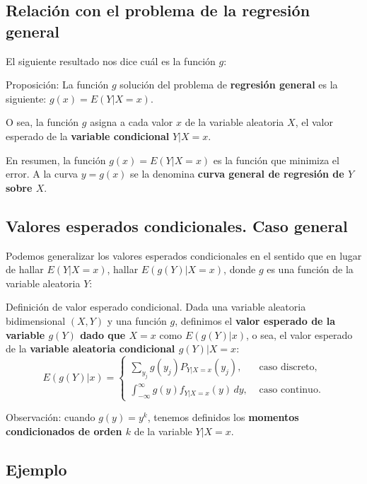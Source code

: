 \documentclass[]{book}
\begin{document}
\hypertarget{relaciuxf3n-con-el-problema-de-la-regresiuxf3n-general-1}{%
\subsection{Relación con el problema de la regresión general}\label{relaciuxf3n-con-el-problema-de-la-regresiuxf3n-general-1}}

El siguiente resultado nos dice cuál es la función \(g\):

Proposición:
La función \(g\) solución del problema de \textbf{regresión general} es la siguiente: \(g(x)=E(Y|X=x)\).

O sea, la función \(g\) asigna a cada valor \(x\) de la variable aleatoria \(X\), el valor esperado de la \textbf{variable condicional} \(Y|X=x\).

En resumen, la función \(g(x)=E(Y|X=x)\) es la función que minimiza el error. A la curva \(y=g(x)\) se la denomina \textbf{curva general de regresión de \(Y\) sobre \(X\)}.

\hypertarget{valores-esperados-condicionales.-caso-general}{%
\subsection{Valores esperados condicionales. Caso general}\label{valores-esperados-condicionales.-caso-general}}

Podemos generalizar los valores esperados condicionales en el sentido que en lugar de hallar \(E(Y|X=x)\), hallar \(E(g(Y)|X=x)\), donde \(g\) es una función de la variable aleatoria \(Y\):

Definición de valor esperado condicional.
Dada una variable aleatoria bidimensional \((X,Y)\) y una función \(g\), definimos el \textbf{valor esperado de la variable \(g(Y)\) dado que \(X=x\)} como \(E(g(Y)|x)\), o sea, el valor esperado de la \textbf{variable aleatoria condicional \(g(Y)|X=x\)}:
\[
E(g(Y)|x)=\begin{cases}
\sum_{y_j} g(y_j) P_{Y|X=x}(y_j), & \mbox{ caso discreto,}\\
\int_{-\infty}^\infty g(y) f_{Y|X=x}(y)\,dy, & \mbox{ caso continuo.}
\end{cases}
\]

Observación: cuando \(g(y)=y^k\), tenemos definidos los \textbf{momentos condicionados de orden \(k\)} de la variable \(Y|X=x\).

\hypertarget{ejemplo-70}{%
\subsection{Ejemplo}\label{ejemplo-70}}
\end{document}
